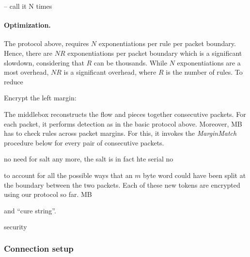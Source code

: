 
 -- call it N times
 
 
\paragraph{Optimization.} The protocol above, requires $N$ exponentiations per rule per packet boundary. 
Hence, there are $N R$ exponentiations per packet boundary which is a significant slowdown, considering that $R$ can be thousands. 
While $N$ exponentiations are a most overhead, $N R$ is a significant overhead, where $R$ is the number of rules. To reduce 



 \begin{framed}
\begin{algorithmic}[1]

	\State \Comment Encrypt the left margin: 
		\State {}
	\EndFor
\EndProcedure
\end{algorithmic}
\end{framed}

 
 The middlebox reconstructs the flow and pieces together consecutive packets. For each packet, it performs detection 
as in the basic protocol above. Moreover, MB has to check rules across packet margins. For this, it invokes  the 
{\em MarginMatch} procedure below for every pair of consecutive packets. 

\begin{framed}
\begin{algorithmic}[1]
	\State {}
\EndProcedure
\end{algorithmic}
\end{framed}

no need for salt any more, the salt is in fact hte serial no

 
 
  to account 
 for all the possible ways that an $m$ byte word could have been split at the boundary between the two packets.
 Each of these new tokens are encrypted using our protocol so far.
 MB 
 
 and ``cure string''.
 
 security

 
 \subsubsection{Connection setup}
 
